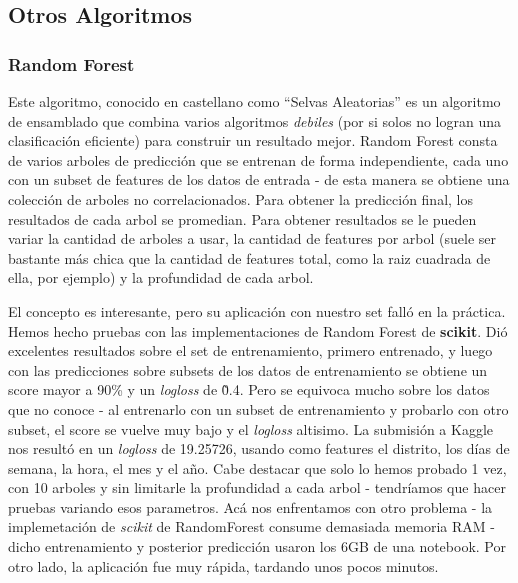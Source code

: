 
\subsection{Otros Algoritmos} %
\label{sub:otros_algoritmos}

\subsubsection{Random Forest} %
\label{ssub:random_forest}

Este algoritmo, conocido en castellano como ``Selvas Aleatorias'' es un algoritmo de ensamblado que combina varios algoritmos \textit{debiles} (por si solos no logran una clasificación eficiente) para construir un resultado mejor. Random Forest consta de varios arboles de predicción que se entrenan de forma independiente, cada uno con un subset de features de los datos de entrada - de esta manera se obtiene una colección de arboles no correlacionados. Para obtener la predicción final, los resultados de cada arbol se promedian. Para obtener resultados se le pueden variar la cantidad de arboles a usar, la cantidad de features por arbol (suele ser bastante más chica que la cantidad de features total, como la raiz cuadrada de ella, por ejemplo) y la profundidad de cada arbol.

El concepto es interesante, pero su aplicación con nuestro set falló en la práctica. Hemos hecho pruebas con las implementaciones de Random Forest de \textbf{scikit}. Dió excelentes resultados sobre el set de entrenamiento, primero entrenado, y luego con las predicciones sobre subsets de los datos de entrenamiento se obtiene un score mayor a 90\% y un \textit{logloss} de \~0.4. Pero se equivoca mucho sobre los datos que no conoce - al entrenarlo con un subset de entrenamiento y probarlo con otro subset, el score se vuelve muy bajo y el \textit{logloss} altisimo. La submisión a Kaggle nos resultó en un \textit{logloss} de 19.25726, usando como features el distrito, los días de semana, la hora, el mes y el año. Cabe destacar que solo lo hemos probado 1 vez, con 10 arboles y sin limitarle la profundidad a cada arbol - tendríamos que hacer pruebas variando esos parametros. Acá nos enfrentamos con otro problema - la implemetación de \textit{scikit} de RandomForest consume demasiada memoria RAM - dicho entrenamiento y posterior predicción usaron los 6GB de una notebook. Por otro lado, la aplicación fue muy rápida, tardando unos pocos minutos.


